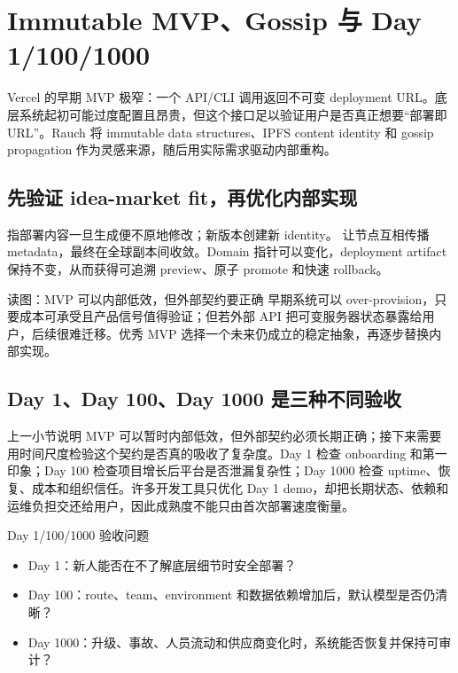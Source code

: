 \section{Immutable MVP、Gossip 与 Day 1/100/1000}

Vercel 的早期 MVP 极窄：一个 API/CLI 调用返回不可变 deployment URL。底层系统起初可能过度配置且昂贵，但这个接口足以验证用户是否真正想要“部署即 URL”。Rauch 将 immutable data structures、IPFS content identity 和 gossip propagation 作为灵感来源，随后用实际需求驱动内部重构。

\subsection{先验证 idea-market fit，再优化内部实现}

 指部署内容一旦生成便不原地修改；新版本创建新 identity。 让节点互相传播 metadata，最终在全球副本间收敛。Domain 指针可以变化，deployment artifact 保持不变，从而获得可追溯 preview、原子 promote 和快速 rollback。


\begin{knowledgebox}{读图：MVP 可以内部低效，但外部契约要正确}
早期系统可以 over-provision，只要成本可承受且产品信号值得验证；但若外部 API 把可变服务器状态暴露给用户，后续很难迁移。优秀 MVP 选择一个未来仍成立的稳定抽象，再逐步替换内部实现。
\end{knowledgebox}

\subsection{Day 1、Day 100、Day 1000 是三种不同验收}

上一小节说明 MVP 可以暂时内部低效，但外部契约必须长期正确；接下来需要用时间尺度检验这个契约是否真的吸收了复杂度。Day 1 检查 onboarding 和第一印象；Day 100 检查项目增长后平台是否泄漏复杂性；Day 1000 检查 uptime、恢复、成本和组织信任。许多开发工具只优化 Day 1 demo，却把长期状态、依赖和运维负担交还给用户，因此成熟度不能只由首次部署速度衡量。


\begin{importantbox}{Day 1/100/1000 验收问题}
\begin{itemize}
  \item Day 1：新人能否在不了解底层细节时安全部署？
  \item Day 100：route、team、environment 和数据依赖增加后，默认模型是否仍清晰？
  \item Day 1000：升级、事故、人员流动和供应商变化时，系统能否恢复并保持可审计？
\end{itemize}
\end{importantbox}

